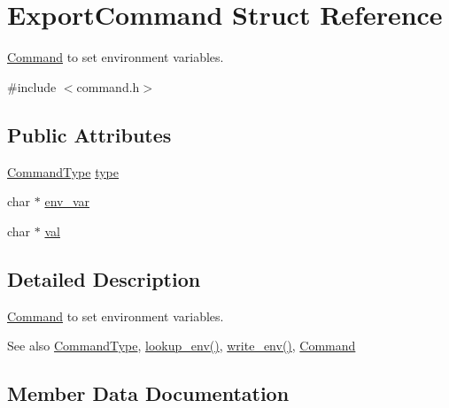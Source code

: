 \hypertarget{structExportCommand}{}\section{Export\+Command Struct Reference}
\label{structExportCommand}


\hyperlink{unionCommand}{Command} to set environment variables.  




{\ttfamily \#include $<$command.\+h$>$}

\subsection*{Public Attributes}
\begin{DoxyCompactItemize}
\item 
\hyperlink{command_8h_a21e038f5b8958e203d28bc4f18472352}{Command\+Type} \hyperlink{structExportCommand_a6089a285f9584b6f1c5430b46a9c0758}{type}
\item 
char $\ast$ \hyperlink{structExportCommand_a8343f52c0f5198ccb21ed3f0c13d5842}{env\+\_\+var}
\item 
char $\ast$ \hyperlink{structExportCommand_a8e75db85606e5f9cfcc149c116c3be51}{val}
\end{DoxyCompactItemize}


\subsection{Detailed Description}
\hyperlink{unionCommand}{Command} to set environment variables. 

\begin{DoxySeeAlso}{See also}
\hyperlink{command_8h_aa8311e0de296df9816965be35c31d925}{Command\+Type}, \hyperlink{execute_8c_afeab372587374ba444aa9bdfb6cfa0d8}{lookup\+\_\+env()}, \hyperlink{execute_8h_afa91981c1edd7bb1c86292d80b27e170}{write\+\_\+env()}, \hyperlink{unionCommand}{Command} 
\end{DoxySeeAlso}


\subsection{Member Data Documentation}
\mbox{\label{structExportCommand_a8343f52c0f5198ccb21ed3f0c13d5842}} 

